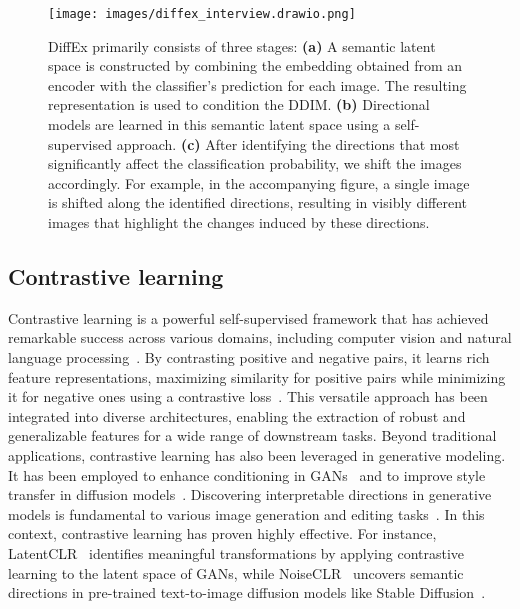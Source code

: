 \begin{figure*}[ht]
  \centering
  \texttt{[image: images/diffex\_interview.drawio.png]} %
  \caption{DiffEx primarily consists of three stages: \textbf{(a)} A semantic latent space is constructed by combining the embedding obtained from an encoder with the classifier's prediction for each image. The resulting representation is used to condition the DDIM. \textbf{(b)} Directional models are learned in this semantic latent space using a self-supervised approach. \textbf{(c)} After identifying the directions that most significantly affect the classification probability, we shift the images accordingly. For example, in the accompanying figure, a single image is shifted along the identified directions, resulting in visibly different images that highlight the changes induced by these directions.}
  \label{fig:main_figure}
\end{figure*}

\subsection{Contrastive learning}

Contrastive learning is a powerful self-supervised framework that has achieved remarkable success across various domains, including computer vision and natural language processing~\cite{simclr,clip,language_1,language_2}. By contrasting positive and negative pairs, it learns rich feature representations, maximizing similarity for positive pairs while minimizing it for negative ones using a contrastive loss~\cite{simclr,INFO_NCE,triplet_loss,contrastive_learning}. This versatile approach has been integrated into diverse architectures, enabling the extraction of robust and generalizable features for a wide range of downstream tasks. Beyond traditional applications, contrastive learning has also been leveraged in generative modeling. It has been employed to enhance conditioning in GANs~\cite{contragan} and to improve style transfer in diffusion models~\cite{diffusion_contra}. Discovering interpretable directions in generative models is fundamental to various image generation and editing tasks~\cite{latent_clr,noise_clr,diffusion_semantic_space}. In this context, contrastive learning has proven highly effective. For instance, LatentCLR~\cite{latent_clr} identifies meaningful transformations by applying contrastive learning to the latent space of GANs, while NoiseCLR~\cite{noise_clr} uncovers semantic directions in pre-trained text-to-image diffusion models like Stable Diffusion~\cite{stable_diffusion}.